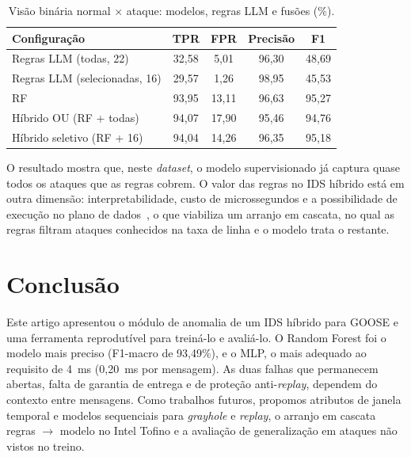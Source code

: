 \documentclass[12pt]{article}
\begin{document}
\begin{table}[ht]
\centering
\caption{Visão binária normal $\times$ ataque: modelos, regras LLM e fusões (\%).}
\label{tab:hib}
\small
\begin{tabular}{lcccc}
\toprule
Configuração & TPR & FPR & Precisão & F1\\
\midrule
Regras LLM (todas, 22)        & 32,58 & 5,01  & 96,30 & 48,69\\
Regras LLM (selecionadas, 16) & 29,57 & 1,26  & 98,95 & 45,53\\
RF                            & 93,95 & 13,11 & 96,63 & 95,27\\
Híbrido OU (RF + todas)       & 94,07 & 17,90 & 95,46 & 94,76\\
Híbrido seletivo (RF + 16)    & 94,04 & 14,26 & 96,35 & 95,18\\
\bottomrule
\end{tabular}
\end{table}

O resultado mostra que, neste \textit{dataset}, o modelo supervisionado já captura quase
todos os ataques que as regras cobrem. O valor das regras no IDS híbrido está
em outra dimensão: interpretabilidade, custo de microssegundos e a possibilidade
de execução no plano de dados~\cite{xavier2021programmable}, o que viabiliza um
arranjo em cascata, no qual as regras filtram ataques conhecidos na taxa de
linha e o modelo trata o restante.

\section{Conclusão}

Este artigo apresentou o módulo de anomalia de um IDS híbrido para GOOSE e uma
ferramenta reprodutível para treiná-lo e avaliá-lo. O Random Forest foi o
modelo mais preciso (F1-macro de 93,49\%), e o MLP, o mais adequado ao
requisito de 4~ms (0,20~ms por mensagem). As duas falhas que permanecem abertas,
falta de garantia de entrega e de proteção anti-\textit{replay}, dependem do
contexto entre mensagens. Como trabalhos futuros, propomos atributos de janela
temporal e modelos sequenciais para \textit{grayhole} e \textit{replay}, o
arranjo em cascata regras $\to$ modelo no Intel Tofino e a avaliação de
generalização em ataques não vistos no treino.



\end{document}

